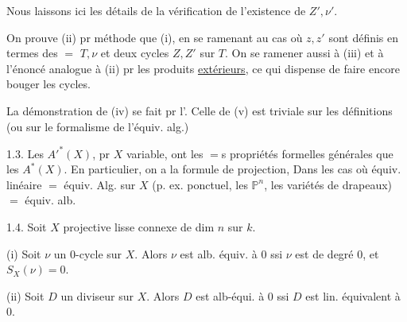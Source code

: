 



Nous laissons ici les détails de la vérification de l'existence de $Z',\nu'$.

On prouve (ii) pr  \inserted{$=$} méthode que (i),  en se ramenant au cas où $z,z'$ sont définis en termes des $=$ $T,\nu$ et deux cycles $Z,Z'$ sur $T$. On  se ramener aussi à (iii) et à l'énoncé analogue à (ii) pr les produits \uline{extérieurs}, ce qui dispense de faire encore bouger les cycles.

La démonstration de (iv) se fait pr l'. Celle de (v) est triviale sur les définitions (ou sur le formalisme de l'équiv. alg.)


 \uline{} 1.3. Les $A'^*(X)$, pr $X$ variable, ont les $=$s propriétés formelles générales que les $A^*(X)$. En particulier, on a la formule de projection, Dans les cas où équiv. linéaire $=$ équiv. Alg. sur $X$ (p. ex.  ponctuel, les $\mathbb P^n$, les variétés de drapeaux)  $=$ équiv. alb.



 1.4. Soit \(X\) projective lisse connexe de dim \(n\) sur \(k\). 

(i) Soit \(\nu\) un 0-cycle sur \(X\). Alors \(\nu\) est alb. équiv. à 0 ssi \(\nu\) est de degré 0, et \(S_X(\nu)=0\).

(ii) Soit \(D\) un diviseur sur \(X\). Alors \(D\) est alb-équi. à 0 ssi \(D\) est lin. équivalent à 0.

